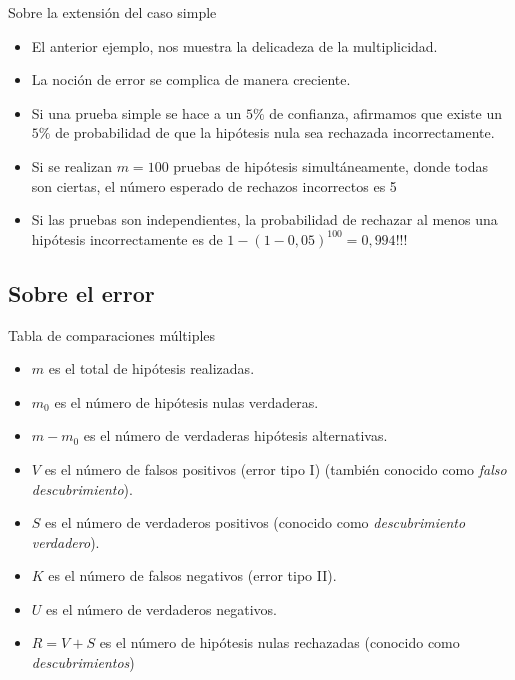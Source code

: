 \begin{frame}{Sobre la extensión del caso simple}
\begin{rr}
\begin{itemize}
    \item El anterior ejemplo, nos muestra la delicadeza de la multiplicidad.
    \item La noción de error se complica de manera creciente.
    \item  Si una prueba simple se hace a un $5\%$ de confianza, afirmamos que existe un $5\%$ de probabilidad de que la hipótesis nula sea rechazada incorrectamente.
    \item Si se realizan $m = 100$ pruebas de hipótesis simultáneamente, donde todas son ciertas, el número esperado de rechazos incorrectos es 5
    \item Si las pruebas son independientes, la probabilidad de rechazar al menos una hipótesis incorrectamente es de $1 - (1-0,05)^{100} =0,994$!!!
\end{itemize}
\end{rr}
\end{frame}


\subsection{Sobre el error}
\begin{frame}{Tabla de comparaciones múltiples}
\begin{itemize}
	\item $m$ es el total de hipótesis realizadas.
	\item $m_0$ es el número de hipótesis nulas verdaderas.
	\item $m-m_0$ es el número de verdaderas hipótesis alternativas.
	\item $V$ es el número de falsos positivos (error tipo I) (también conocido como \textit{falso descubrimiento}).
	\item $S$ es el número de verdaderos positivos (conocido como \textit{descubrimiento verdadero}).
	\item $K$ es el número de falsos negativos (error tipo II).
	\item $U$ es el número de verdaderos negativos.
	\item $R=V+S$ es el número de hipótesis nulas rechazadas (conocido como \textit{descubrimientos})
\end{itemize}
\end{frame}





